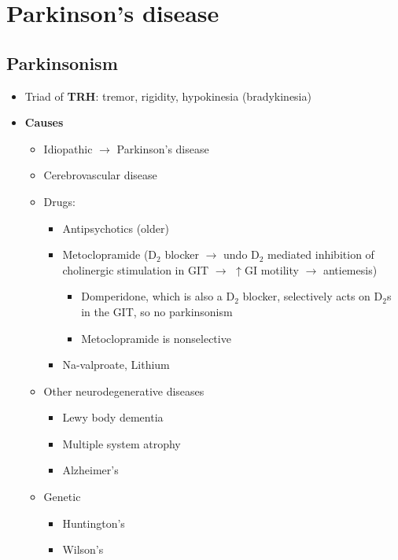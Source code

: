 \documentclass[
  12pt,
]{memoir}
\providecommand{\tightlist}{%
  \setlength{\itemsep}{0pt}\setlength{\parskip}{0pt}}
\begin{document}
\pagebreak

\hypertarget{parkinsons-disease}{%
\section{Parkinson's disease}\label{parkinsons-disease}}

\hypertarget{parkinsonism}{%
\subsection{Parkinsonism}\label{parkinsonism}}

\begin{itemize}
\tightlist
\item
  Triad of \textbf{TRH}: tremor, rigidity, hypokinesia (bradykinesia)
\item
  \textbf{Causes}

  \begin{itemize}
  \tightlist
  \item
    Idiopathic \(\rightarrow\) Parkinson's disease
  \item
    Cerebrovascular disease
  \item
    Drugs:

    \begin{itemize}
    \tightlist
    \item
      Antipsychotics (older)
    \item
      Metoclopramide (D\(_2\) blocker \(\rightarrow\) undo D\(_2\)
      mediated inhibition of cholinergic stimulation in GIT
      \(\rightarrow\) \(\uparrow\)GI motility \(\rightarrow\)
      antiemesis)

      \begin{itemize}
      \tightlist
      \item
        Domperidone, which is also a D\(_2\) blocker, selectively acts
        on D\(_2\)s in the GIT, so no parkinsonism
      \item
        Metoclopramide is nonselective
      \end{itemize}
    \item
      Na-valproate, Lithium
    \end{itemize}
  \item
    Other neurodegenerative diseases

    \begin{itemize}
    \tightlist
    \item
      Lewy body dementia
    \item
      Multiple system atrophy
    \item
      Alzheimer's
    \end{itemize}
  \item
    Genetic

    \begin{itemize}
    \tightlist
    \item
      Huntington's
    \item
      Wilson's
    \end{itemize}
  \end{itemize}
\end{itemize}
\end{document}
